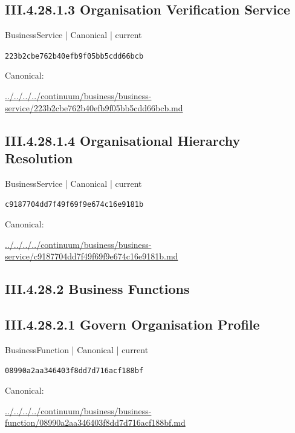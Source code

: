 \documentclass[10pt,a4paper]{article}
\begin{document}
\subsection*{III.4.28.1.3 Organisation Verification Service}
{\small BusinessService | Canonical | current}\par
\texttt{223b2cbe762b40efb9f05bb5cdd66bcb}\par
Canonical: \par
{\footnotesize\url{../../../../continuum/business/business-service/223b2cbe762b40efb9f05bb5cdd66bcb.md}}\par
\subsection*{III.4.28.1.4 Organisational Hierarchy Resolution}
{\small BusinessService | Canonical | current}\par
\texttt{c9187704dd7f49f69f9e674c16e9181b}\par
Canonical: \par
{\footnotesize\url{../../../../continuum/business/business-service/c9187704dd7f49f69f9e674c16e9181b.md}}\par
\subsection*{III.4.28.2 Business Functions}
\subsection*{III.4.28.2.1 Govern Organisation Profile}
{\small BusinessFunction | Canonical | current}\par
\texttt{08990a2aa346403f8dd7d716acf188bf}\par
Canonical: \par
{\footnotesize\url{../../../../continuum/business/business-function/08990a2aa346403f8dd7d716acf188bf.md}}\par
\end{document}
